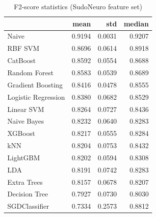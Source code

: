 \begin{table}
\caption{F2-score statistics (SudoNeuro feature set)}
\label{tab:f2_SudoNeuro_stats}
\begin{tabular}{lrrr}
\toprule
 & mean & std & median \\
\midrule
Naive & 0.9194 & 0.0031 & 0.9207 \\
RBF SVM & 0.8696 & 0.0614 & 0.8918 \\
CatBoost & 0.8592 & 0.0554 & 0.8688 \\
Random Forest & 0.8583 & 0.0539 & 0.8689 \\
Gradient Boosting & 0.8416 & 0.0478 & 0.8555 \\
Logistic Regression & 0.8380 & 0.0682 & 0.8529 \\
Linear SVM & 0.8264 & 0.0727 & 0.8436 \\
Naive Bayes & 0.8232 & 0.0640 & 0.8283 \\
XGBoost & 0.8217 & 0.0555 & 0.8284 \\
kNN & 0.8204 & 0.0753 & 0.8432 \\
LightGBM & 0.8202 & 0.0594 & 0.8308 \\
LDA & 0.8191 & 0.0742 & 0.8283 \\
Extra Trees & 0.8157 & 0.0678 & 0.8207 \\
Decision Tree & 0.7927 & 0.0730 & 0.8030 \\
SGDClassifier & 0.7334 & 0.2573 & 0.8812 \\
\bottomrule
\end{tabular}
\end{table}
